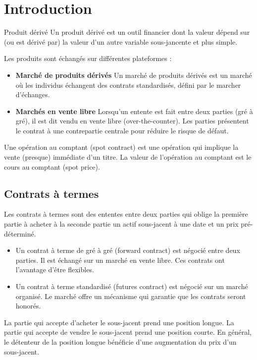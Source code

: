 \chapter{Introduction}

\begin{definition}{Produit dérivé}{}
	Un produit dérivé est un outil financier dont la valeur dépend sur (ou est dérivé par) la valeur d'un autre variable sous-jancente et plus simple. 
\end{definition}

Les produits sont échangés sur différentes plateformes : 

\begin{itemize}
	\item \textbf{Marché de produits dérivés} Un marché de produits dérivés est un marché où les individus échangent des contrats standardisés, défini par le marcher d'échanges.  
	\item \textbf{Marchés en vente libre} Lorsqu'un entente est fait entre deux parties (gré à gré), il est dit vendu en vente libre (over-the-counter). Les parties présentent le contrat à une contrepartie centrale pour réduire le risque de défaut. 
\end{itemize}

Une opération au comptant (spot contract) est une opération qui implique la vente (presque) immédiate d'un titre. La valeur de l'opération au comptant est le cours au comptant (spot price). 

\section{Contrats à termes}

Les contrats à termes sont des ententes entre deux parties qui oblige la première partie à acheter à la seconde partie un actif sous-jacent à une date et un prix pré-déterminé. 

\begin{itemize} 
	\item Un contrat à terme de gré à gré (forward contract) est négocié entre deux parties. Il est échangé sur un marché en vente libre. Ces contrats ont l'avantage d'être flexibles. 
	\item Un contrat à terme standardisé (futures contract) est négocié sur un marché organisé. Le marché offre un mécanisme qui garantie que les contrats seront honorés. 
\end{itemize}

La partie qui accepte d'acheter le sous-jacent prend une position longue. La partie qui accepte de vendre le sous-jacent prend une position courte. En général, le détenteur de la position longue bénéficie d'une augmentation du prix d'un sous-jacent. 

